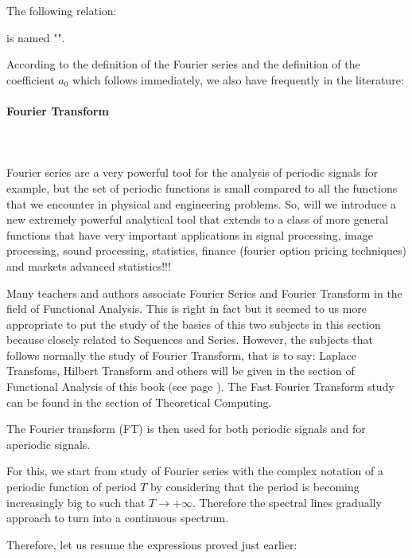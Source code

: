 	The following relation:
	
	is named "".
	
	According to the definition of the Fourier series and the definition of the coefficient $a_0$ which follows immediately, we also have frequently in the literature:
	
	
	
	\pagebreak
	\paragraph{Fourier Transform}\label{fourier transform}\mbox{}\\\\
	Fourier series are a very powerful tool for the analysis of periodic signals for example, but the set of periodic functions is small compared to all the functions that we encounter in physical and engineering problems. So, will we introduce a new extremely powerful analytical tool that extends to a class of more general functions that have very important applications in signal processing, image processing, sound processing, statistics, finance (fourier option pricing techniques) and markets advanced statistics!!!
	
	\begin{tcolorbox}[title=Remark,colframe=black,arc=10pt]
	Many teachers and authors associate Fourier Series and Fourier Transform in the field of Functional Analysis. This is right in fact but it seemed to us more appropriate to put the study of the basics of this two subjects in this section because closely related to Sequences and Series. However, the subjects that follows normally the study of Fourier Transform, that is to say: Laplace Transfoms, Hilbert Transform and others will be given in the section of Functional Analysis of this book (see page \pageref{fourier transform analysis}). The Fast Fourier Transform study can be found in the section of Theoretical Computing.
	\end{tcolorbox}
	The Fourier transform (FT) is then used for both periodic signals and for aperiodic signals.
	
	For this, we start from study of Fourier series with the complex notation of a periodic function of period $T$ by considering that the period is becoming increasingly big to such that $T\rightarrow +\infty$. Therefore the spectral lines gradually approach to turn into a continuous spectrum.
	
	Therefore, let us resume the expressions proved just earlier:
	
